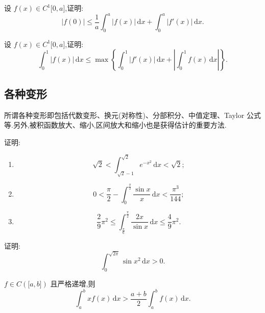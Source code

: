 \documentclass[../数学分析培优讲义.tex]{subfiles}
\begin{document}
\begin{example}
设 $f(x)\in C^1\lbrack 0,a\rbrack$,证明:
\[
    |f(0)|\leq\dfrac{1}{a}\int_0^a|f(x)|\,\mathrm{d}x
    +\int_0^a|f'(x)|\,\mathrm{d}x.
\]
\end{example}
\exampleblank

\begin{example}
设 $f(x)\in C^1\lbrack 0,a\rbrack$,证明:
\[
    \int_0^1|f(x)|\,\mathrm{d}x
    \leq\max\left\{\int_0^1|f'(x)|\,\mathrm{d}x+
    \left|\int_0^1f(x)\,\mathrm{d}x\right|\right\}.
\]
\end{example}
\exampleblank


\newpage

\subsection{各种变形}

所谓各种变形即包括代数变形、换元(对称性)、分部积分、中值定理、Taylor 公式等.另外,被积函数放大、缩小,区间放大和缩小也是获得估计的重要方法.


\newpage


\begin{example}
证明:
\begin{enumerate}[label=(\arabic*)]
    \item
    \[
        \sqrt{2}<\int_{\sqrt{2}-1}^{\sqrt{2}}e^{-x^2}\,\mathrm{d}x<\sqrt{2};
    \]
    \item
    \[
        0<\dfrac{\pi}{2}-\int_0^{\frac{\pi}{2}}\dfrac{\sin x}{x}\,\mathrm{d}x
        <\dfrac{\pi^3}{144};
    \]
    \item
    \[
        \dfrac{2}{9}\pi^2
        \leq\int_{\frac{\pi}{6}}^{\frac{\pi}{2}}\dfrac{2x}{\sin x}\,\mathrm{d}x
        \leq\dfrac{4}{9}\pi^2.
    \]
\end{enumerate}
\end{example}
\exampleblank


\newpage


\begin{example}
证明:
\[
    \int_0^{\sqrt{2\pi}}\sin x^2\,\mathrm{d}x>0.
\]
\end{example}
\exampleblank

\begin{example}
$f\in C(\lbrack a,b\rbrack)$ 且严格递增,则
\[
    \int_a^bxf(x)\,\mathrm{d}x
    >\dfrac{a+b}{2}\int_a^bf(x)\,\mathrm{d}x.
\]
\end{example}
\exampleblank
\end{document}
